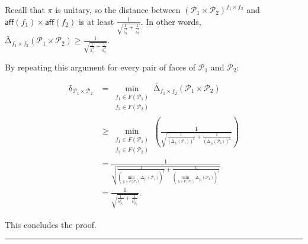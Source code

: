 \documentclass{article}
\newcommand{\R}{\mathbb{R}}
\newcommand{\jmlrBlackBox}{\rule{1.5ex}{1.5ex}}
\newcommand{\jmlrQED}{\hfill\jmlrBlackBox\par\bigskip}
\providecommand{\proofname}{Proof}
\renewenvironment{proof}%
{%
 \par\noindent{\bfseries\upshape \proofname\ }%
}%
{\jmlrQED}
\newcommand{\mP}{\mathcal{P}}
\newcommand{\aff}[1]{\mathsf{aff}\left(#1\right)}
\newcommand{\w}[1]{\operatorname{\delta}_{#1}}
\newcommand{\what}{\operatorname{\bar{\delta}}}
\newcommand{\whatface}[2]{\operatorname{\bar{\Delta}}_{#1}(#2)}
\begin{document}
\begin{proof}
  Recall that $\pi$ is unitary, so the distance between $\left(\mP_1\times \mP_2\right)^{f_1\times f_2}$ and $\aff{f_1}\times \aff{f_2}$ is at least $\frac{1}{\sqrt{\frac{1}{\what_1^2}+\frac{1}{\what_2^2}}}$. In other words, $\whatface{f_1\times f_2}{\mP_1\times \mP_2}\geq \frac{1}{\sqrt{\frac{1}{\what_1^2}+\frac{1}{\what_2^2}}}$.

  By repeating this argument for every pair of faces of $\mP_1$ and $\mP_2$:

   \begin{align*}
     \w{\mP_1\times \mP_2} &= \min_{\substack{f_1\in F(\mP_1)\\ f_2\in F(\mP_2)}} \whatface{f_1\times f_2}{\mP_1\times \mP_2} \\
               &\geq \min_{\substack{f_1\in F(\mP_1)\\ f_2\in F(\mP_2)}} \left(\frac{1}{\sqrt{\frac{1}{\left(\whatface{f_1}{\mP_1}\right)^2} + \frac{1}{\left(\whatface{f_2}{\mP_2}\right)^2} }} \right) \\
               &= \frac{1}{\sqrt{\frac{1}{\left(\min_{f_1\in F(\mP_1)}\whatface{f_1}{\mP_1}\right)^2}+\frac{1}{\left(\min_{f_2\in F(\mP_2)}\whatface{f_2}{\mP_2}\right)^2}}} \\
               &= \frac{1}{\sqrt{\frac{1}{\w{\mP_1}^2}+\frac{1}{\w{\mP_2}^2}}}.
   \end{align*}

   This concludes the proof.
\end{proof}

\end{document}
